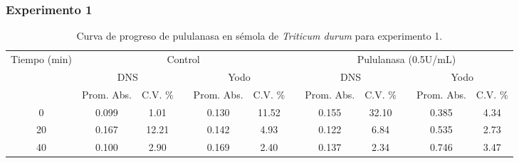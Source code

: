 \documentclass{article}
\begin{document}
\subsubsection{Experimento 1}
\begin{table}[H]
	\centering
	\caption{Curva de progreso de pululanasa en sémola de \textit{Triticum durum} para experimento 1.}
		\begin{adjustbox}{width=\textwidth}
	\begin{tabular}{cccccccccccc}
		\toprule
		\multicolumn{1}{c}{\multirow{3}[6]{*}{Tiempo (min)}} & \multicolumn{5}{c}{Control}           &       & \multicolumn{5}{c}{Pululanasa (0.5U/mL)} \\
		\cmidrule{2-6}\cmidrule{8-12}          & \multicolumn{2}{c}{DNS} &       & \multicolumn{2}{c}{Yodo} &       & \multicolumn{2}{c}{DNS} &       & \multicolumn{2}{c}{Yodo} \\
		\cmidrule{2-3}\cmidrule{5-6}\cmidrule{8-9}  \cmidrule{11-12}         & Prom. Abs. & C.V. \% &       & Prom. Abs. & C.V. \% &       & Prom. Abs. & C.V. \% &       & Prom. Abs. & C.V. \% \\
		\midrule
		0     & 0.099 & 1.01  &       & 0.130 & 11.52 &       & 0.155 & 32.10 &       & 0.385 & 4.34 \\
		20    & 0.167 & 12.21 &       & 0.142 & 4.93  &       & 0.122 & 6.84  &       & 0.535 & 2.73 \\
		40    & 0.100 & 2.90  &       & 0.169 & 2.40  &       & 0.137 & 2.34  &       & 0.746 & 3.47 \\
		\bottomrule
	\end{tabular}%
	\end{adjustbox}
	\label{tab:e1.1}%
\end{table}%
\end{document}
